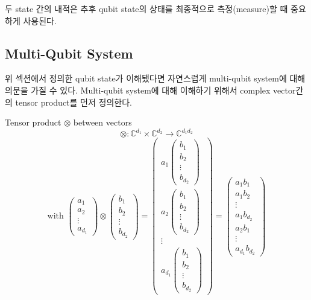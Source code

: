 \noindent 두 state 간의 내적은 추후 qubit state의 상태를 최종적으로 측정(measure)할 때 중요하게 사용된다.

\subsection{Multi-Qubit System}

위 섹션에서 정의한 qubit state가 이해됐다면 자연스럽게 multi-qubit system에 대해 의문을 가질 수 있다. Multi-qubit system에 대해 이해하기 위해서 complex vector간의 tensor product를 먼저 정의한다.

\begin{definition}
Tensor product \(\otimes\) between vectors
    \[
        \otimes : \mathbb{C}^{d_1} \times \mathbb{C}^{d_2} \rightarrow \mathbb{C}^{d_1  d_2}
    \]
    \[
    \text{with }
    \begin{pmatrix}
        a_1 \\ a_2 \\ \vdots \\ a_{d_1}
        \end{pmatrix}
        \otimes
        \begin{pmatrix}
        b_1 \\ b_2 \\ \vdots \\ b_{d_2}
        \end{pmatrix}
        =
        \begin{pmatrix}
        a_1\begin{pmatrix}
        b_1 \\ b_2 \\ \vdots \\ b_{d_2}
        \end{pmatrix}
         \\ a_2\begin{pmatrix}
        b_1 \\ b_2 \\ \vdots \\ b_{d_2}
        \end{pmatrix}
        \\
            \vdots
        \\ a_{d_1}\begin{pmatrix}
        b_1 \\ b_2 \\ \vdots \\ b_{d_2}
        \end{pmatrix}
        \end{pmatrix}
        =
        \begin{pmatrix}
        a_1b_1 \\ a_1b_2 \\ \vdots \\ a_1b_{d_2} \\ a_2b_1 \\ \vdots \\ a_{d_1}b_{d_2}
        \end{pmatrix}
    \]
\end{definition}

